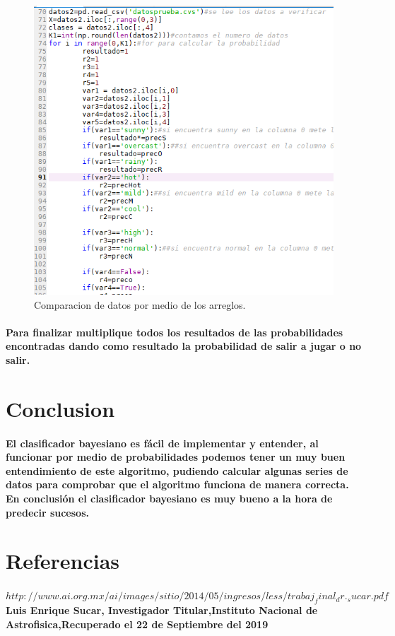 \documentclass[10pt,a4paper]{article}
\begin{document}
\begin{figure}[h]
\includegraphics[scale=0.4] {codigo3.png}
\caption{Comparacion de datos por medio de los arreglos.}
\label{fig:Binarizacion}
\end{figure}

\paragraph{Para finalizar multiplique todos los resultados de las probabilidades encontradas dando como resultado la probabilidad de salir a jugar o no salir.}

\section{Conclusion}
\paragraph{El clasificador bayesiano es f\'acil de implementar y entender, al funcionar por medio de probabilidades podemos tener un muy buen entendimiento de este algoritmo, pudiendo calcular algunas series de datos para comprobar que el algoritmo funciona de manera correcta.
En conclusi\'on el clasificador bayesiano es muy bueno a la hora de predecir sucesos.}

\section{Referencias}
\paragraph{$http://www.ai.org.mx/ai/images/sitio/2014/05/ingresos/less/trabaj_final_dr._sucar.pdf$ Luis Enrique Sucar, Investigador Titular,Instituto Nacional de Astrofisica,Recuperado el 22 de Septiembre del 2019}
\end{document}

